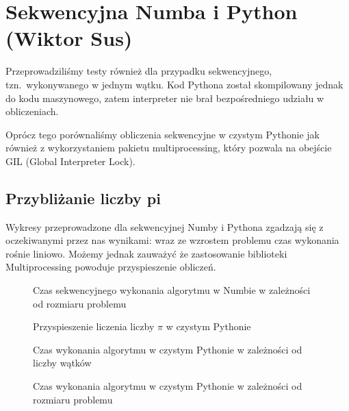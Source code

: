 \section{Sekwencyjna Numba i Python (Wiktor Sus)}
Przeprowadziliśmy testy również dla przypadku sekwencyjnego, tzn.\ wykonywanego w jednym wątku.
Kod Pythona został skompilowany jednak do kodu maszynowego, zatem interpreter nie brał bezpośredniego udziału w obliczeniach.

Oprócz tego porównaliśmy obliczenia sekwencyjne w czystym Pythonie jak również z wykorzystaniem pakietu multiprocessing,
który pozwala na obejście GIL (Global Interpreter Lock).

\subsection{Przybliżanie liczby pi}
Wykresy przeprowadzone dla sekwencyjnej Numby i Pythona zgadzają się z oczekiwanymi przez nas wynikami: wraz ze wzrostem problemu czas wykonania rośnie liniowo.
Możemy jednak zauważyć że zastosowanie biblioteki Multiprocessing powoduje przyspieszenie obliczeń.

\begin{figure*}
    \centering
    
    \caption{Czas sekwencyjnego wykonania algorytmu w Numbie w zależności od rozmiaru problemu}
    \label{fig:numba-seq-sizes}
\end{figure*}

\begin{figure*}
    \centering
    \begin{minipage}[b]{.45\textwidth}
        \centering
        
        \caption{Przyspieszenie liczenia liczby $\pi$ w czystym Pythonie}
        \label{fig:python-speedup}
    \end{minipage}
    \hfill
    \begin{minipage}[b]{.45\textwidth}
        \centering
        
        \caption{Czas wykonania algorytmu w czystym Pythonie w zależności od liczby wątków}
        \label{fig:python-threads}
    \end{minipage}
\end{figure*}

\begin{figure*}
    \centering
    
    \caption{Czas wykonania algorytmu w czystym Pythonie w zależności od rozmiaru problemu}
    \label{fig:python-sizes}
\end{figure*}
